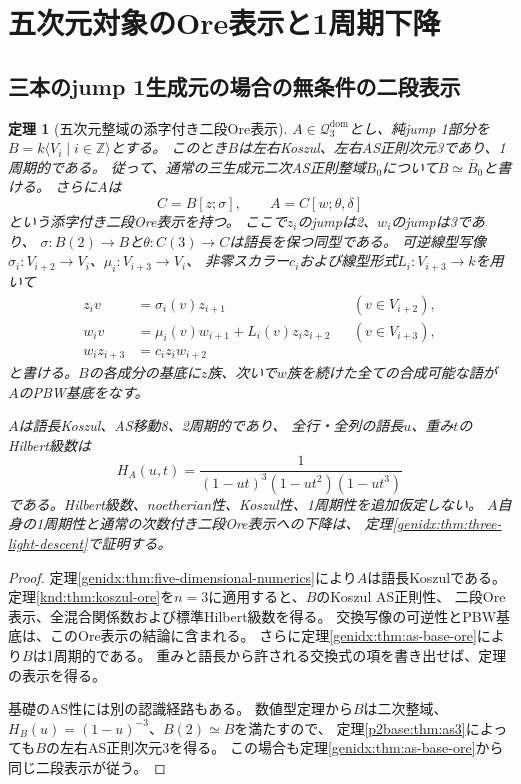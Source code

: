 \documentclass[11pt,a4paper]{ltjsarticle}
\newtheorem{theorem}{定理}[section]
\theoremstyle{definition}
\begin{document}
\section{五次元対象のOre表示と1周期下降}\label{sec:three-light-descent}
\subsection{三本のjump 1生成元の場合の無条件の二段表示}

\begin{theorem}[五次元整域の添字付き二段Ore表示]
\label{genidx:thm:three-light-ore}
$A\in\mathcal Q_3^{\mathrm{dom}}$とし、純jump 1部分を
$B=k\langle V_i\mid i\in\mathbb Z\rangle$とする。
このとき$B$は左右Koszul、左右AS正則次元3であり、1周期的である。
従って、通常の三生成元二次AS正則整域$B_0$について$B\simeq\check{B_0}$と書ける。
さらに$A$は
\[
C=B[z;\sigma],\qquad A=C[w;\theta,\delta]
\]
という添字付き二段Ore表示を持つ。
ここで$z_i$のjumpは2、$w_i$のjumpは3であり、
$\sigma:B(2)\to B$と$\theta:C(3)\to C$は語長を保つ同型である。
可逆線型写像$\sigma_i:V_{i+2}\to V_i$、$\mu_i:V_{i+3}\to V_i$、
非零スカラー$c_i$および線型形式$L_i:V_{i+3}\to k$を用いて
\[
\begin{aligned}
z_i v&=\sigma_i(v)z_{i+1} &&(v\in V_{i+2}),\\
w_i v&=\mu_i(v)w_{i+1}+L_i(v)z_i z_{i+2} &&(v\in V_{i+3}),\\
w_i z_{i+3}&=c_i z_i w_{i+2}
\end{aligned}
\]
と書ける。$B$の各成分の基底に$z$族、次いで$w$族を続けた全ての合成可能な語が
$A$のPBW基底をなす。

$A$は語長Koszul、AS移動8、2周期的であり、
全行・全列の語長$u$、重み$t$のHilbert級数は
\[
H_A(u,t)=\frac{1}{(1-ut)^3(1-ut^2)(1-ut^3)}
\]
である。Hilbert級数、noetherian性、Koszul性、1周期性を追加仮定しない。
$A$自身の1周期性と通常の次数付き二段Ore表示への下降は、
定理\ref{genidx:thm:three-light-descent}で証明する。
\end{theorem}
\begin{proof}
定理\ref{genidx:thm:five-dimensional-numerics}により$A$は語長Koszulである。
定理\ref{knd:thm:koszul-ore}を$n=3$に適用すると、$B$のKoszul AS正則性、
二段Ore表示、全混合関係数および標準Hilbert級数を得る。
交換写像の可逆性とPBW基底は、このOre表示の結論に含まれる。
さらに定理\ref{genidx:thm:as-base-ore}により$B$は1周期的である。
重みと語長から許される交換式の項を書き出せば、定理の表示を得る。

基礎のAS性には別の認識経路もある。
数値型定理から$B$は二次整域、$H_B(u)=(1-u)^{-3}$、$B(2)\simeq B$を満たすので、
定理\ref{p2base:thm:as3}によっても$B$の左右AS正則次元3を得る。
この場合も定理\ref{genidx:thm:as-base-ore}から同じ二段表示が従う。
\end{proof}
\end{document}
